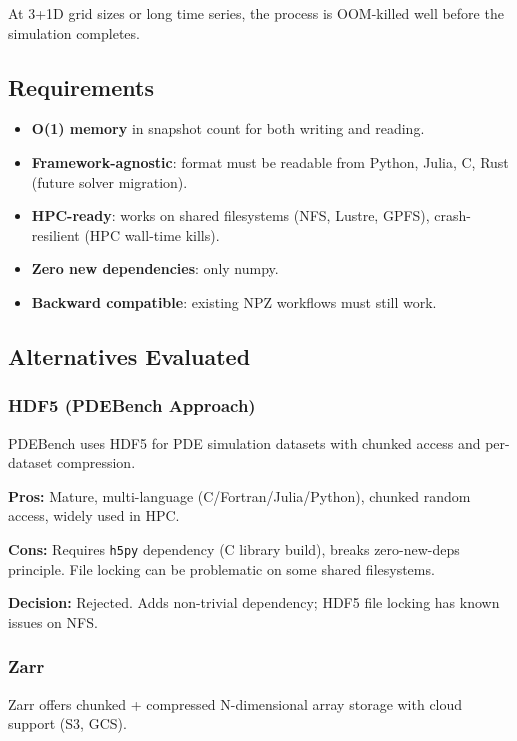 At 3+1D grid sizes or long time series, the process is OOM-killed well before the simulation completes.


\subsection{Requirements}
\label{sec:adr-requirements}

\begin{itemize}
  \item \textbf{O(1) memory} in snapshot count for both writing and reading.
  \item \textbf{Framework-agnostic}: format must be readable from Python, Julia, C, Rust (future solver migration).
  \item \textbf{HPC-ready}: works on shared filesystems (NFS, Lustre, GPFS), crash-resilient (HPC wall-time kills).
  \item \textbf{Zero new dependencies}: only numpy.
  \item \textbf{Backward compatible}: existing NPZ workflows must still work.
\end{itemize}


\subsection{Alternatives Evaluated}
\label{sec:adr-alternatives}

\subsubsection{HDF5 (PDEBench Approach)}

PDEBench uses HDF5 for PDE simulation datasets with chunked access and per-dataset compression.

\textbf{Pros:} Mature, multi-language (C/Fortran/Julia/Python), chunked random access, widely used in HPC.

\textbf{Cons:} Requires \texttt{h5py} dependency (C library build), breaks zero-new-deps principle. File locking can be problematic on some shared filesystems.

\textbf{Decision:} Rejected. Adds non-trivial dependency; HDF5 file locking has known issues on NFS.

\subsubsection{Zarr}

Zarr offers chunked + compressed N-dimensional array storage with cloud support (S3, GCS).

